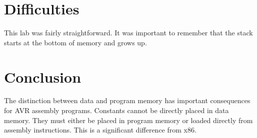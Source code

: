 \documentclass[12pt,letterpaper]{article}
\begin{document}
\section{Difficulties}
This lab was fairly straightforward. It was important to remember that the stack starts at the bottom of memory and grows up.

\section{Conclusion}
The distinction between data and program memory has important consequences for AVR assembly programs. Constants cannot be directly placed in data memory. They must either be placed in program memory or loaded directly from assembly instructions. This is a significant difference from x86.
\end{document}
